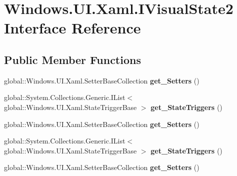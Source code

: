 \hypertarget{interface_windows_1_1_u_i_1_1_xaml_1_1_i_visual_state2}{}\section{Windows.\+U\+I.\+Xaml.\+I\+Visual\+State2 Interface Reference}
\label{interface_windows_1_1_u_i_1_1_xaml_1_1_i_visual_state2}
\subsection*{Public Member Functions}
\begin{DoxyCompactItemize}
\item 
\mbox{\label{interface_windows_1_1_u_i_1_1_xaml_1_1_i_visual_state2_a76685d6c9814d665e4399a7b89aedc0d}} 
global\+::\+Windows.\+U\+I.\+Xaml.\+Setter\+Base\+Collection {\bfseries get\+\_\+\+Setters} ()
\item 
\mbox{\label{interface_windows_1_1_u_i_1_1_xaml_1_1_i_visual_state2_ae75ceca48a5fb3f4f83a14db3035df89}} 
global\+::\+System.\+Collections.\+Generic.\+I\+List$<$ global\+::\+Windows.\+U\+I.\+Xaml.\+State\+Trigger\+Base $>$ {\bfseries get\+\_\+\+State\+Triggers} ()
\item 
\mbox{\label{interface_windows_1_1_u_i_1_1_xaml_1_1_i_visual_state2_a76685d6c9814d665e4399a7b89aedc0d}} 
global\+::\+Windows.\+U\+I.\+Xaml.\+Setter\+Base\+Collection {\bfseries get\+\_\+\+Setters} ()
\item 
\mbox{\label{interface_windows_1_1_u_i_1_1_xaml_1_1_i_visual_state2_ae75ceca48a5fb3f4f83a14db3035df89}} 
global\+::\+System.\+Collections.\+Generic.\+I\+List$<$ global\+::\+Windows.\+U\+I.\+Xaml.\+State\+Trigger\+Base $>$ {\bfseries get\+\_\+\+State\+Triggers} ()
\item 
\mbox{\label{interface_windows_1_1_u_i_1_1_xaml_1_1_i_visual_state2_a76685d6c9814d665e4399a7b89aedc0d}} 
global\+::\+Windows.\+U\+I.\+Xaml.\+Setter\+Base\+Collection {\bfseries get\+\_\+\+Setters} ()
\item 

\end{DoxyCompactItemize}
